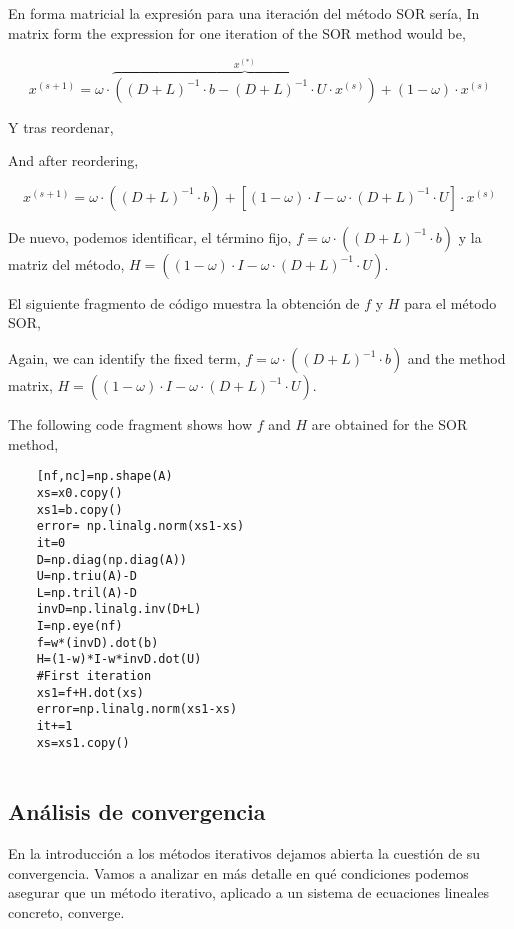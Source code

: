 \begin{paracol}{2}
En forma matricial la expresión para una iteración del método SOR sería,
\switchcolumn
In matrix form the expression for one iteration of the SOR method would be,
\end{paracol}
\begin{equation*}
x^{(s+1)}= \omega\cdot\overbrace{\left((D+L)^{-1}\cdot b-(D+L)^{-1}\cdot U\cdot x^{(s)}\right)}^{x^{(*)}}+(1-\omega)\cdot x^{(s)}
\end{equation*}
\begin{paracol}{2}

Y tras reordenar,

\switchcolumn
And after reordering,

\end{paracol}

\begin{equation*}
x^{(s+1)}= \omega\cdot\left((D+L)^{-1}\cdot b\right)+\left[(1-\omega)\cdot I-\omega\cdot(D+L)^{-1}\cdot U\right]\cdot x^{(s)}
\end{equation*}

\begin{paracol}{2}
De nuevo, podemos identificar, el término fijo, $f=\omega\cdot\left((D+L)^{-1}\cdot b\right)$ y la matriz del método, $H=\left((1-\omega)\cdot I-\omega\cdot(D+L)^{-1}\cdot U\right)$.

El siguiente fragmento de código muestra la obtención de $f$ y $H$ para el método SOR,

\switchcolumn

Again, we can identify the fixed term, $f=\omega\cdot\left((D+L)^{-1}\cdot b\right)$ and the method matrix, $H=\left((1-\omega)\cdot I-\omega\cdot(D+L)^{-1}\cdot U\right)$.

The following code fragment shows how $f$ and $H$ are obtained for the SOR method,    
\end{paracol}

\begin{verbatim}
    [nf,nc]=np.shape(A)
    xs=x0.copy()
    xs1=b.copy()
    error= np.linalg.norm(xs1-xs)
    it=0
    D=np.diag(np.diag(A))
    U=np.triu(A)-D
    L=np.tril(A)-D
    invD=np.linalg.inv(D+L)
    I=np.eye(nf)
    f=w*(invD).dot(b)
    H=(1-w)*I-w*invD.dot(U)
    #First iteration
    xs1=f+H.dot(xs)
    error=np.linalg.norm(xs1-xs)
    it+=1
    xs=xs1.copy()
    
\end{verbatim}

\subsection{Análisis de convergencia}
En la introducción a los métodos iterativos dejamos abierta la cuestión de su convergencia. Vamos a analizar en más detalle en qué condiciones podemos asegurar que un método iterativo, aplicado a un sistema de ecuaciones lineales concreto, converge. 

